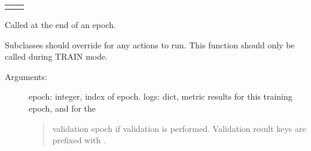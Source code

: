 \documentclass[letterpaper,10pt,english]{sphinxmanual}
\begin{document}
\begin{fulllineitems}
\begin{savenotes}\sphinxattablestart
\centering
\begin{tabulary}{\linewidth}[t]{|T|T|}
\hline

&\\
\hline
{}
&\\
\hline
\end{tabulary}
\par
\sphinxattableend\end{savenotes}

\begin{fulllineitems}
\label{\detokenize{utils/callbacks:utils.callbacks.ModelCheckpoint.on_epoch_end}}
Called at the end of an epoch.

Subclasses should override for any actions to run. This function should only
be called during TRAIN mode.
\begin{description}
\item[{Arguments:}] \leavevmode
epoch: integer, index of epoch.
logs: dict, metric results for this training epoch, and for the
\begin{quote}

validation epoch if validation is performed. Validation result keys
are prefixed with .
\end{quote}

\end{description}

\end{fulllineitems}


\end{fulllineitems}

\end{document}
